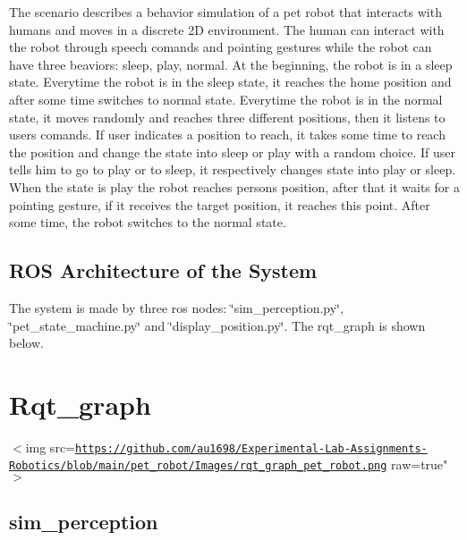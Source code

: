 The scenario describes a behavior simulation of a pet robot that interacts with humans and moves in a discrete 2D environment. The human can interact with the robot through speech comands and pointing gestures while the robot can have three beaviors\+: sleep, play, normal. At the beginning, the robot is in a sleep state. Everytime the robot is in the sleep state, it reaches the home position and after some time switches to normal state. Everytime the robot is in the normal state, it moves randomly and reaches three different positions, then it listens to user\textquotesingle{}s comands. If user indicates a position to reach, it takes some time to reach the position and change the state into \textquotesingle{}sleep\textquotesingle{} or \textquotesingle{}play\textquotesingle{} with a random choice. If user tells him to go to play or to sleep, it respectively changes state into \textquotesingle{}play\textquotesingle{} or \textquotesingle{}sleep\textquotesingle{}. When the state is \textquotesingle{}play\textquotesingle{} the robot reaches person\textquotesingle{}s position, after that it waits for a pointing gesture, if it receives the target position, it reaches this point. After some time, the robot switches to the \textquotesingle{}normal\textquotesingle{} state.

\subsection*{R\+OS Architecture of the System}

The system is made by three ros nodes\+: \char`\"{}sim\+\_\+perception.\+py\char`\"{}, \char`\"{}pet\+\_\+state\+\_\+machine.\+py\char`\"{} and \char`\"{}display\+\_\+position.\+py\char`\"{}. The rqt\+\_\+graph is shown below.

\section*{Rqt\+\_\+graph}

$<$img src=\href{https://github.com/au1698/Experimental-Lab-Assignments-Robotics/blob/main/pet_robot/Images/rqt_graph_pet_robot.png}{\tt https\+://github.\+com/au1698/\+Experimental-\/\+Lab-\/\+Assignments-\/\+Robotics/blob/main/pet\+\_\+robot/\+Images/rqt\+\_\+graph\+\_\+pet\+\_\+robot.\+png} raw=true"$>$ 

\subsection*{sim\+\_\+perception}

